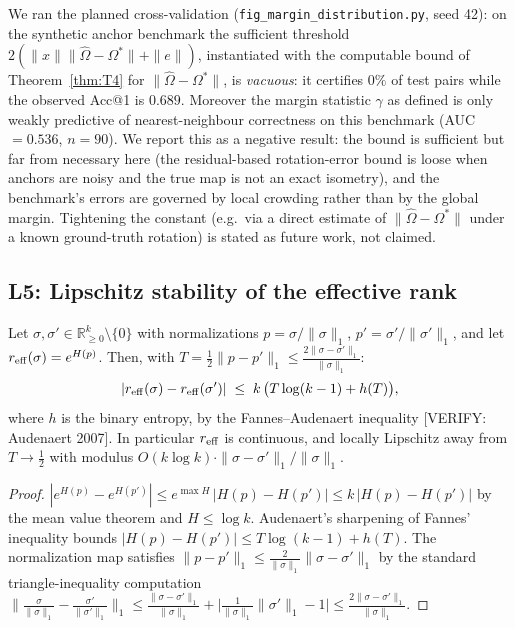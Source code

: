 \begin{remark}
We ran the planned cross-validation
(\texttt{fig\_margin\_distribution.py}, seed 42): on the synthetic
anchor benchmark the sufficient threshold
$2(\|x\|\|\hat\Omega-\Omega^{*}\|+\|e\|)$, instantiated with the
computable bound of Theorem~\ref{thm:T4} for
$\|\hat\Omega-\Omega^{*}\|$, is \emph{vacuous}: it certifies $0\%$ of
test pairs while the observed Acc@1 is $0.689$. Moreover the margin
statistic $\gamma$ as defined is only weakly predictive of
nearest-neighbour correctness on this benchmark (AUC $=0.536$,
$n=90$). We report this as a negative result: the bound is sufficient
but far from necessary here (the residual-based rotation-error bound
is loose when anchors are noisy and the true map is not an exact
isometry), and the benchmark's errors are governed by local crowding
rather than by the global margin. Tightening the constant (e.g.\ via
a direct estimate of $\|\hat\Omega-\Omega^{*}\|$ under a known
ground-truth rotation) is stated as future work, not claimed.
\end{remark}

\subsection{L5: Lipschitz stability of the effective rank}

\begin{lemma}
\label{lem:L5}
Let $\sigma,\sigma'\in\mathbb{R}^{k}_{\ge0}\setminus\{0\}$ with
normalizations $p=\sigma/\|\sigma\|_1$, $p'=\sigma'/\|\sigma'\|_1$,
and let $r_{\mathrm{eff}}(\sigma)=e^{H(p)}$. Then, with
$T=\tfrac12\|p-p'\|_1\le\tfrac{2\|\sigma-\sigma'\|_1}{\|\sigma\|_1}$:
\[
|r_{\mathrm{eff}}(\sigma)-r_{\mathrm{eff}}(\sigma')|
\;\le\;k\,\bigl(T\log(k-1)+h(T)\bigr),
\]
where $h$ is the binary entropy, by the Fannes--Audenaert inequality
[VERIFY: Audenaert 2007]. In particular $r_{\mathrm{eff}}$ is continuous, and
locally Lipschitz away from $T\to\tfrac12$ with modulus
$O(k\log k)\cdot\|\sigma-\sigma'\|_1/\|\sigma\|_1$.
\end{lemma}

\begin{proof}
$|e^{H(p)}-e^{H(p')}|\le e^{\max H}\,|H(p)-H(p')|\le k\,|H(p)-H(p')|$
by the mean value theorem and $H\le\log k$. Audenaert's sharpening of
Fannes' inequality bounds $|H(p)-H(p')|\le T\log(k-1)+h(T)$. The
normalization map satisfies
$\|p-p'\|_1\le\frac{2}{\|\sigma\|_1}\|\sigma-\sigma'\|_1$ by the
standard triangle-inequality computation
$\|\frac{\sigma}{\|\sigma\|_1}-\frac{\sigma'}{\|\sigma'\|_1}\|_1
\le\frac{\|\sigma-\sigma'\|_1}{\|\sigma\|_1}
+\bigl|\frac{1}{\|\sigma\|_1}\|\sigma'\|_1-1\bigr|
\le\frac{2\|\sigma-\sigma'\|_1}{\|\sigma\|_1}$.
\end{proof}

